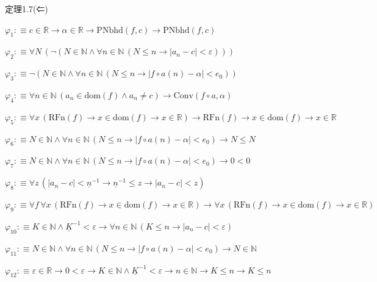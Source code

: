 \begin{fullproof}{定理1.7(⇐)}
\begin{ptree}
\end{ptree}
\begin{abbrevlist}
\item $\varphi_{1} :\equiv c \in \mathbb{R} \to \alpha \in \mathbb{R} \to \mathrm{PNbhd}(f,c) \to \mathrm{PNbhd}(f,c)$
\item $\varphi_{2} :\equiv \forall N\,(\neg (N \in \mathbb{N} \land \forall n \in \mathbb{N}\,(N \leq n \to \lvert a_{n} - c \rvert < \varepsilon)))$
\item $\varphi_{3} :\equiv \neg (N \in \mathbb{N} \land \forall n \in \mathbb{N}\,(N \leq n \to \lvert f \circ a(n) - \alpha \rvert < e_{0}))$
\item $\varphi_{4} :\equiv \forall n \in \mathbb{N}\,(a_{n} \in \mathrm{dom}(f) \land a_{n} \neq c) \to \mathrm{Conv}(f \circ a,\alpha)$
\item $\varphi_{5} :\equiv \forall x\,(\mathrm{RFn}(f) \to x \in \mathrm{dom}(f) \to x \in \mathbb{R}) \to \mathrm{RFn}(f) \to x \in \mathrm{dom}(f) \to x \in \mathbb{R}$
\item $\varphi_{6} :\equiv N \in \mathbb{N} \land \forall n \in \mathbb{N}\,(N \leq n \to \lvert f \circ a(n) - \alpha \rvert < e_{0}) \to N \leq N$
\item $\varphi_{7} :\equiv N \in \mathbb{N} \land \forall n \in \mathbb{N}\,(N \leq n \to \lvert f \circ a(n) - \alpha \rvert < e_{0}) \to 0 < 0$
\item $\varphi_{8} :\equiv \forall z\,(\lvert a_{n} - c \rvert < \underline{n}^{-1} \to \underline{n}^{-1} \leq z \to \lvert a_{n} - c \rvert < z)$
\item $\varphi_{9} :\equiv \forall f\,\forall x\,(\mathrm{RFn}(f) \to x \in \mathrm{dom}(f) \to x \in \mathbb{R}) \to \forall x\,(\mathrm{RFn}(f) \to x \in \mathrm{dom}(f) \to x \in \mathbb{R})$
\item $\varphi_{10} :\equiv K \in \mathbb{N} \land \underline{K}^{-1} < \varepsilon \to \forall n \in \mathbb{N}\,(K \leq n \to \lvert a_{n} - c \rvert < \varepsilon)$
\item $\varphi_{11} :\equiv N \in \mathbb{N} \land \forall n \in \mathbb{N}\,(N \leq n \to \lvert f \circ a(n) - \alpha \rvert < e_{0}) \to N \in \mathbb{N}$
\item $\varphi_{12} :\equiv \varepsilon \in \mathbb{R} \to 0 < \varepsilon \to K \in \mathbb{N} \land \underline{K}^{-1} < \varepsilon \to n \in \mathbb{N} \to K \leq n \to K \leq n$

\end{abbrevlist}
\end{fullproof}
